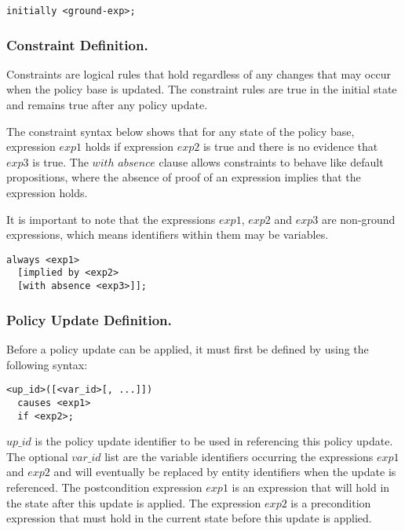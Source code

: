 \documentclass[11pt]{llncs}
\begin{document}
        \begin{verbatim}initially <ground-exp>;\end{verbatim}

      \subsubsection{Constraint Definition.}

        Constraints are logical rules that hold regardless of any changes
        that may occur when the policy base is updated. The constraint rules
        are true in the initial state and remains true after any policy
        update.

        The constraint syntax below shows that for any state of the policy
        base, expression $exp1$ holds if expression $exp2$ is true and there
        is no evidence that $exp3$ is true. The $with$ $absence$ clause
        allows constraints to behave like default propositions, where the
        absence of proof of an expression implies that the expression holds.

        It is important to note that the expressions $exp1$, $exp2$ and
        $exp3$ are non-ground expressions, which means identifiers within
        them may be variables.

        \begin{verbatim}always <exp1>
  [implied by <exp2>
  [with absence <exp3>]];\end{verbatim}

      \subsubsection{Policy Update Definition.}

        Before a policy update can be applied, it must first be defined by
        using the following syntax:

        \begin{verbatim}<up_id>([<var_id>[, ...]])
  causes <exp1>
  if <exp2>;\end{verbatim}

        $up\_id$ is the policy update identifier to be used in referencing
        this policy update. The optional $var\_id$ list are the variable
        identifiers occurring the expressions $exp1$ and $exp2$ and will
        eventually be replaced by entity identifiers when the update is
        referenced. The postcondition expression $exp1$ is an expression that
        will hold in the state after this update is applied. The expression
        $exp2$ is a precondition expression that must hold in the current
        state before this update is applied.
\end{document}
